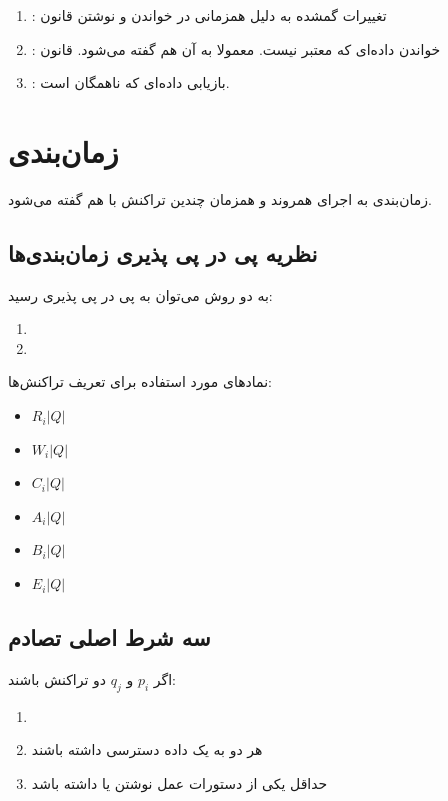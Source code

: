 \documentclass[a4paper]{article}
\begin{document}
\begin{enumerate}
    \item {}: تغییرات گمشده به دلیل همزمانی در خواندن و نوشتن
    قانون 
    \item {}: خواندن داده‌ای که معتبر نیست. معمولا به آن  هم گفته می‌شود. قانون 
    \item {}: بازیابی داده‌ای که ناهمگان است. 
\end{enumerate}

\section{زمان‌بندی}

زمان‌بندی به اجرای همروند و همزمان چندین تراکنش با هم گفته می‌شود.

\subsection{نظریه پی در پی پذیری زمان‌بندی‌ها}

به دو روش می‌توان به پی در پی پذیری رسید:

\begin{enumerate}
    \item {}
    \item {}
\end{enumerate}

نماد‌های مورد استفاده برای تعریف تراکنش‌ها:

\begin{itemize}
    \item $R_{i}| Q |$
    \item $W_{i}| Q |$
    \item $C_{i}| Q |$
    \item $A_{i}| Q |$
    \item $B_{i}| Q |$
    \item $E_{i}| Q |$
\end{itemize}

\subsection{سه شرط اصلی تصادم}

اگر $p_{i}$ و $q_{j}$ دو تراکنش باشند:

\begin{enumerate}
    \item {}
    \item هر دو به یک داده دسترسی داشته باشند
    \item حداقل یکی از دستورات عمل نوشتن یا  داشته باشد
\end{enumerate}
\end{document}

